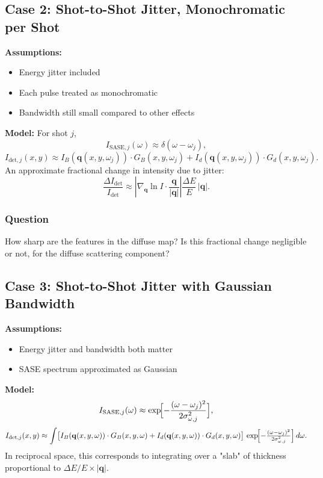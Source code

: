 \documentclass[12pt,a4paper]{article}
\begin{document}
\subsection{Case 2: Shot-to-Shot Jitter, Monochromatic per Shot}
\textbf{Assumptions:}
\begin{itemize}
\item Energy jitter included
\item Each pulse treated as monochromatic
\item Bandwidth still small compared to other effects
\end{itemize}
\textbf{Model:}
For shot $j$,
\begin{equation}
I_{\text{SASE},j}(\omega) \approx \delta(\omega - \omega_j),
\end{equation}
\begin{equation}
I_{\text{det},j}(x,y) \approx I_B(\mathbf{q}(x,y,\omega_j)) \cdot G_B(x,y,\omega_j) + I_d(\mathbf{q}(x,y,\omega_j)) \cdot G_d(x,y,\omega_j).
\end{equation}
An approximate fractional change in intensity due to jitter:
\begin{equation}
\frac{\Delta I_{\text{det}}}{I_{\text{det}}} \approx \left|\nabla_{\mathbf{q}} \ln I \cdot \frac{\mathbf{q}}{|\mathbf{q}|}\right|\frac{\Delta E}{E}\,|\mathbf{q}|.
\end{equation}

\subsubsection*{Question}
How sharp are the features in the diffuse map? Is this fractional change negligible or not, for the diffuse scattering component?

\subsection{Case 3: Shot-to-Shot Jitter with Gaussian Bandwidth}
\textbf{Assumptions:}
\begin{itemize}
\item Energy jitter and bandwidth both matter
\item SASE spectrum approximated as Gaussian
\end{itemize}
\textbf{Model:}
\begin{equation}
I_{\text{SASE},j}(\omega) \approx \exp\!\Bigl[-\frac{(\omega - \omega_j)^2}{2\sigma_{\omega,j}^2}\Bigr],
\end{equation}
\begin{equation}
I_{\text{det},j}(x,y) \approx \int \bigl[I_B(\mathbf{q}(x,y,\omega)) \cdot G_B(x,y,\omega) + I_d(\mathbf{q}(x,y,\omega)) \cdot G_d(x,y,\omega)\bigr]\,
\exp\!\Bigl[-\tfrac{(\omega - \omega_j)^2}{2\sigma_{\omega,j}^2}\Bigr]\, d\omega.
\end{equation}
In reciprocal space, this corresponds to integrating over a "slab" of thickness proportional to $\Delta E/E \times |\mathbf{q}|$.
\end{document}

